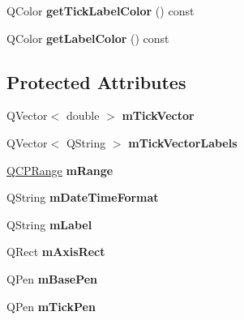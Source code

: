 \begin{DoxyCompactItemize}
\item 
\hypertarget{classQCPAxis_a0f8583f7ac24ccc70d39fdd2389cad6e}{Q\-Color {\bfseries get\-Tick\-Label\-Color} () const }\label{classQCPAxis_a0f8583f7ac24ccc70d39fdd2389cad6e}

\item 
\hypertarget{classQCPAxis_a42bd69b9e9c571f13624079be18ccdc1}{Q\-Color {\bfseries get\-Label\-Color} () const }\label{classQCPAxis_a42bd69b9e9c571f13624079be18ccdc1}

\end{DoxyCompactItemize}
\subsection*{Protected Attributes}
\begin{DoxyCompactItemize}
\item 
\hypertarget{classQCPAxis_aae0f9b9973b85be601200f00f5825087}{Q\-Vector$<$ double $>$ {\bfseries m\-Tick\-Vector}}\label{classQCPAxis_aae0f9b9973b85be601200f00f5825087}

\item 
\hypertarget{classQCPAxis_aeee4bd0fca3f587eafe33843d1cb4f82}{Q\-Vector$<$ Q\-String $>$ {\bfseries m\-Tick\-Vector\-Labels}}\label{classQCPAxis_aeee4bd0fca3f587eafe33843d1cb4f82}

\item 
\hypertarget{classQCPAxis_a1ee36773c49062d751560e11f90845f7}{\hyperlink{classQCPRange}{Q\-C\-P\-Range} {\bfseries m\-Range}}\label{classQCPAxis_a1ee36773c49062d751560e11f90845f7}

\item 
\hypertarget{classQCPAxis_a0b7ad83550d71daab4cfee2918e168e0}{Q\-String {\bfseries m\-Date\-Time\-Format}}\label{classQCPAxis_a0b7ad83550d71daab4cfee2918e168e0}

\item 
\hypertarget{classQCPAxis_ae8001dbdfc47685c1cf7b98b044460e6}{Q\-String {\bfseries m\-Label}}\label{classQCPAxis_ae8001dbdfc47685c1cf7b98b044460e6}

\item 
\hypertarget{classQCPAxis_ad63d51f30f835f3a568b6231362ed4a0}{Q\-Rect {\bfseries m\-Axis\-Rect}}\label{classQCPAxis_ad63d51f30f835f3a568b6231362ed4a0}

\item 
\hypertarget{classQCPAxis_ad6b4a0aee9558fb35529e960b8fef72d}{Q\-Pen {\bfseries m\-Base\-Pen}}\label{classQCPAxis_ad6b4a0aee9558fb35529e960b8fef72d}

\item 
\hypertarget{classQCPAxis_a1d52c78c856d8bd1f331d4ec4e63d944}{Q\-Pen {\bfseries m\-Tick\-Pen}}\label{classQCPAxis_a1d52c78c856d8bd1f331d4ec4e63d944}


\end{DoxyCompactItemize}
